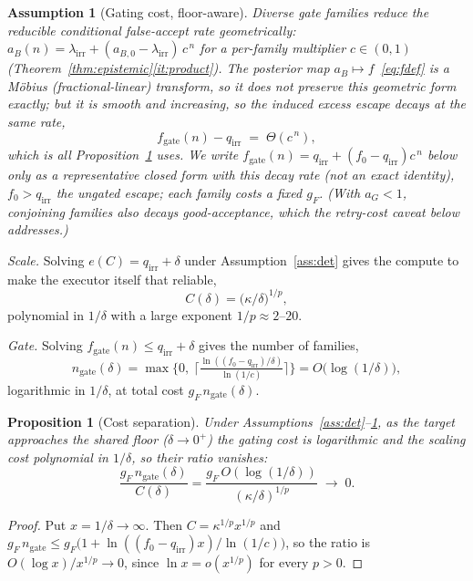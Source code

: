 \documentclass[11pt]{article}
\newtheorem{proposition}{Proposition}
\newtheorem{assumption}{Assumption}
\theoremstyle{definition}
\theoremstyle{remark}
\newcommand{\lirr}{\lambda_{\mathrm{irr}}}
\newcommand{\fesc}{f}
\begin{document}
\begin{assumption}[Gating cost, floor-aware]\label{ass:gate}
Diverse gate families reduce the \emph{reducible} conditional false-accept rate geometrically:
$a_B(n)=\lirr+(a_{B,0}-\lirr)\,c^{\,n}$ for a per-family multiplier $c\in(0,1)$
(Theorem~\ref{thm:epistemic}\eqref{it:product}). The posterior map $a_B\mapsto\fesc$~\eqref{eq:fdef} is a
M\"obius (fractional-linear) transform, so it does \emph{not} preserve this geometric form exactly; but
it is smooth and increasing, so the induced excess escape decays at the \emph{same rate},
\[
f_{\mathrm{gate}}(n)-q_{\mathrm{irr}}\;=\;\Theta(c^{\,n}),
\]
which is all Proposition~\ref{prop:cost} uses. We write $f_{\mathrm{gate}}(n)=q_{\mathrm{irr}}+(\fesc_0-q_{\mathrm{irr}})c^{\,n}$
below only as a representative closed form with this decay rate (not an exact identity), $\fesc_0>q_{\mathrm{irr}}$
the ungated escape; each family costs a fixed $g_F$. (With $a_G<1$, conjoining families also decays
good-acceptance, which the retry-cost caveat below addresses.)
\end{assumption}

\emph{Scale.} Solving $e(C)=q_{\mathrm{irr}}+\delta$ under Assumption~\ref{ass:det} gives the compute to make the
executor itself that reliable,
\begin{equation}\label{eq:det}
C(\delta)=\big(\kappa/\delta\big)^{1/p},
\end{equation}
polynomial in $1/\delta$ with a large exponent $1/p\approx2$--$20$.

\emph{Gate.} Solving $f_{\mathrm{gate}}(n)\le q_{\mathrm{irr}}+\delta$ gives the number of families,
\begin{equation}\label{eq:gate}
n_{\mathrm{gate}}(\delta)=\max\!\Big\{0,\ \Big\lceil\tfrac{\ln((\fesc_0-q_{\mathrm{irr}})/\delta)}{\ln(1/c)}\Big\rceil\Big\}
=O\!\big(\log(1/\delta)\big),
\end{equation}
logarithmic in $1/\delta$, at total cost $g_F\,n_{\mathrm{gate}}(\delta)$.

\begin{proposition}[Cost separation]\label{prop:cost}
Under Assumptions~\ref{ass:det}--\ref{ass:gate}, as the target approaches the shared floor
($\delta\to0^+$) the gating cost is logarithmic and the scaling cost polynomial in $1/\delta$, so their
ratio vanishes:
\[
\frac{g_F\,n_{\mathrm{gate}}(\delta)}{C(\delta)}
=\frac{g_F\,O(\log(1/\delta))}{(\kappa/\delta)^{1/p}}\;\longrightarrow\;0 .
\]
\end{proposition}
\begin{proof}
Put $x=1/\delta\to\infty$. Then $C=\kappa^{1/p}x^{1/p}$ and
$g_F\,n_{\mathrm{gate}}\le g_F\big(1+\ln((\fesc_0-q_{\mathrm{irr}})x)/\ln(1/c)\big)$, so the ratio is
$O(\log x)/x^{1/p}\to0$, since $\ln x=o(x^{1/p})$ for every $p>0$.
\end{proof}
\end{document}
